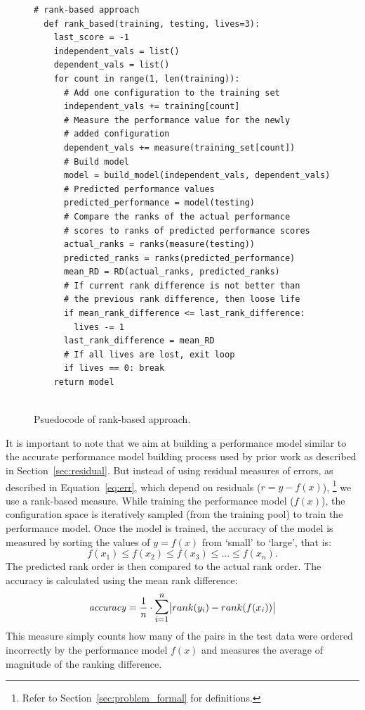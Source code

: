 \begin{figure}[t]
\small
\hspace{0.4cm}\begin{lstlisting}[xrightmargin=5.0ex,mathescape,frame=none,numbers=right]
  # rank-based approach
  def rank_based(training, testing, lives=3): 
    last_score = -1
    independent_vals = list()
    dependent_vals = list()
    for count in range(1, len(training)):    
      # Add one configuration to the training set
      independent_vals += training[count]      
      # Measure the performance value for the newly
      # added configuration 
      dependent_vals += measure(training_set[count])
      # Build model
      model = build_model(independent_vals, dependent_vals)     
      # Predicted performance values
      predicted_performance = model(testing) 
      # Compare the ranks of the actual performance 
      # scores to ranks of predicted performance scores
      actual_ranks = ranks(measure(testing))
      predicted_ranks = ranks(predicted_performance)
      mean_RD = RD(actual_ranks, predicted_ranks)
      # If current rank difference is not better than
      # the previous rank difference, then loose life
      if mean_rank_difference <= last_rank_difference:
        lives -= 1
      last_rank_difference = mean_RD
      # If all lives are lost, exit loop
      if lives == 0: break
    return model
      

\end{lstlisting}
\caption{\small{Psuedocode of rank-based approach.}
}
\label{fig:rank-based}  
\end{figure}
It is important to note that we aim at building a performance model similar to the accurate performance model building process used by prior work as described in Section~\ref{sec:residual}. But instead of using residual measures of errors, as described in Equation~\ref{eq:err}, which depend on residuals ($r = y - f(x)$), \footnote{Refer to Section~\ref{sec:problem_formal} for definitions.} we use a rank-based measure. While training the performance model ($f(x)$), the configuration space is iteratively sampled (from the training pool) to train the performance model. Once the model is trained, the accuracy of the model is measured  by sorting the values of $y=f(x)$ from `small' to `large', that is:
\begin{equation}
    f(x_1) \le f(x_2) \le f(x_3) \le ... \le f(x_n).
\end{equation}
The predicted rank order is then compared to the actual rank order. The accuracy is calculated using the mean rank difference:
\begin{equation} \label{eq:rank_performance}
    \mathit{accuracy} = \frac{1}{n} \cdot \mathlarger{\mathlarger{\sum}}_{i=1}^{n}\abs{rank(y_i) - rank(f(x_i))}
\end{equation}
This measure simply counts how many of the pairs in the test data were ordered incorrectly by the performance model $f(x)$ and measures the average of magnitude of the ranking difference. 



